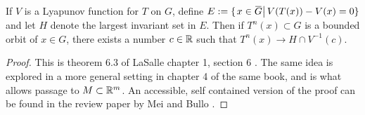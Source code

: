 \begin{thm}\label{thm:invariance}\ \\%
	If \( V \) is a Lyapunov function for \( T \)  on \( G \), define \( E\defined\{\left.x\in\overbar G\right|V(T(x))-V(x)=0\} \) and let \( H \) denote the largest invariant set in \( E \). Then if \( T^n(x)\subset G \) is a bounded orbit of \( x\in G \), there exists a number \( c\in\mathbb R \) such that \( T^n(x)\rightarrow H\cap V^{-1}(c) \).
\end{thm}

\begin{proof}
	This is theorem 6.3 of LaSalle chapter 1, section 6 \cite{lasalle1976dynsys}. The same idea is explored in a more general setting in chapter 4 of the same book, and is what allows passage to \( M\subset\mathbb R^m \). An accessible, self contained version of the proof can be found in the review paper by Mei and Bullo \cite{mei2017lasalle}.
\end{proof}
%
%		